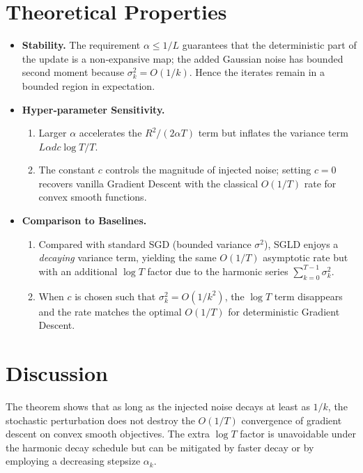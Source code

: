 \documentclass[11pt]{article}
\begin{document}
\section*{Theoretical Properties}
\begin{itemize}[leftmargin=*]
\item \textbf{Stability.} The requirement $\alpha\le 1/L$ guarantees that the deterministic part of the update is a non‑expansive map; the added Gaussian noise has bounded second moment because $\sigma_k^{2}=O(1/k)$. Hence the iterates remain in a bounded region in expectation.

\item \textbf{Hyper‑parameter Sensitivity.} 
  \begin{enumerate}
    \item Larger $\alpha$ accelerates the $R^{2}/(2\alpha T)$ term but inflates the variance term $L\alpha d c\log T/T$.
    \item The constant $c$ controls the magnitude of injected noise; setting $c=0$ recovers vanilla Gradient Descent with the classical $O(1/T)$ rate for convex smooth functions.
  \end{enumerate}

\item \textbf{Comparison to Baselines.}
  \begin{enumerate}
    \item Compared with standard SGD (bounded variance $\sigma^2$), SGLD enjoys a \emph{decaying} variance term, yielding the same $O(1/T)$ asymptotic rate but with an additional $\log T$ factor due to the harmonic series $\sum_{k=0}^{T-1}\sigma_k^{2}$.
    \item When $c$ is chosen such that $\sigma_k^{2}=O(1/k^{2})$, the $\log T$ term disappears and the rate matches the optimal $O(1/T)$ for deterministic Gradient Descent.
  \end{enumerate}
\end{itemize}

\section*{Discussion}
The theorem shows that as long as the injected noise decays at least as $1/k$, the stochastic perturbation does not destroy the $O(1/T)$ convergence of gradient descent on convex smooth objectives. The extra $\log T$ factor is unavoidable under the harmonic decay schedule but can be mitigated by faster decay or by employing a decreasing stepsize $\alpha_k$.
\end{document}

